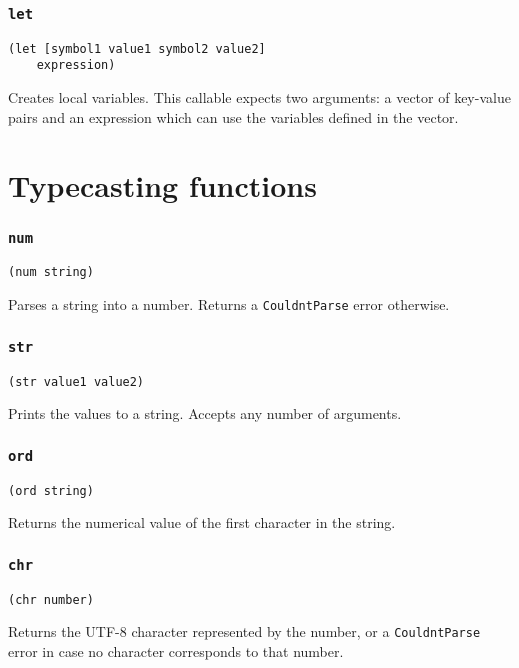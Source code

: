 \documentclass[11pt]{scrreprt}
\begin{document}
\subsubsection{\texttt{let}}
\begin{verbatim}
(let [symbol1 value1 symbol2 value2]
    expression)
\end{verbatim}
Creates local variables. This callable expects two arguments: a vector of key-value pairs and an expression which can use the variables defined in the vector. 


\section{Typecasting functions}
\subsubsection{\texttt{num}}
\begin{verbatim}
(num string)
\end{verbatim}
Parses a string into a number. Returns a \texttt{CouldntParse} error otherwise.

\subsubsection{\texttt{str}}
\begin{verbatim}
(str value1 value2)
\end{verbatim}
Prints the values to a string. Accepts any number of arguments.

\subsubsection{\texttt{ord}}
\begin{verbatim}
(ord string)
\end{verbatim}
Returns the numerical value of the first character in the string.

\subsubsection{\texttt{chr}}
\begin{verbatim}
(chr number)
\end{verbatim}
Returns the UTF-8 character represented by the number, or a \texttt{CouldntParse} error in case no character corresponds to that number.
\end{document}
